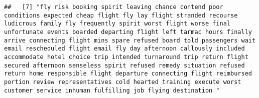 \documentclass[
]{article}
\begin{document}
\begin{verbatim}
##   [7] "fly risk booking spirit leaving chance contend poor conditions expected cheap flight fly lay flight stranded recourse ludicrous family fly frequently spirit worst flight worse final unfortunate events boarded departing flight left tarmac hours finally arrive connecting flight mins spare refused board told passengers wait email rescheduled flight email fly day afternoon callously included accommodate hotel choice trip intended turnaround trip return flight secured afternoon senseless spirit refused remedy situation refused return home responsible flight departure connecting flight reimbursed portion review representatives cold hearted training execute worst customer service inhuman fulfilling job flying destination "                                                                                                                                                                                                                                                                                                                                                                                                                                                                                                                                                                                                                                                                                                                                                                                                                                                                                                                                                                                                                                          

\end{verbatim}
\end{document}
